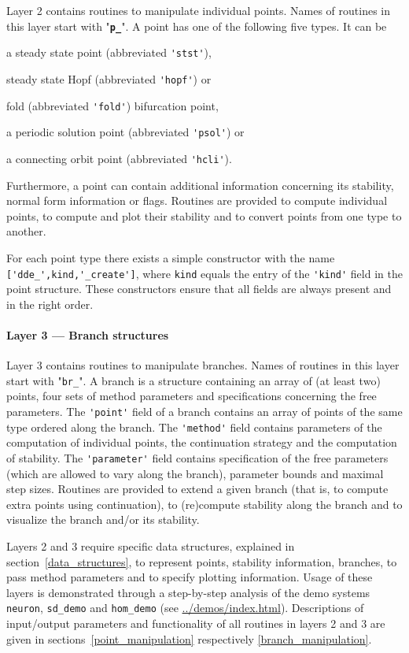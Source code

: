 \documentclass[10pt]{scrartcl}
\newcommand{\file}[1]{\textbf{\texttt{#1}}}
\newcommand{\demobase}{\url{../demos/index.html}}
\newcommand{\blist}[1]{\mbox{\lstinline!#1!}}
\begin{document}
Layer 2 contains routines to manipulate individual points.  Names of
routines in this layer start with "\file{p\_}".  A point has one of
the following five types. It can be
\begin{compactenum}
\item  a steady state point (abbreviated
\blist{'stst'}), 
\item steady state Hopf (abbreviated \blist{'hopf'}) or
\item fold (abbreviated \blist{'fold'}) bifurcation point, 
\item a periodic
  solution point (abbreviated \blist{'psol'}) or 
\item a connecting orbit
  point (abbreviated \blist{'hcli'}).
\end{compactenum}
Furthermore, a point can contain
additional information concerning its stability, normal form
information or flags.  Routines are provided to compute individual
points, to compute and plot their stability and to convert points from
one type to another.

For each point type there exists a simple constructor with the name
\blist{['dde_',kind,'_create']}, where \blist{kind} equals the entry
of the \blist{'kind'} field in the point structure. These constructors
ensure that all fields are always present and in the right order.

\paragraph{Layer 3 --- Branch structures}
Layer 3 contains routines to manipulate branches.  Names of routines
in this layer start with "\blist{br_}". A branch is a structure
containing an array of (at least two) points, four sets of method
parameters and specifications concerning the free parameters.  The
\blist{'point'} field of a branch contains an array of points of the
same type ordered along the branch.  The \blist{'method'} field
contains parameters of the computation of individual points, the
continuation strategy and the computation of stability.  The
\blist{'parameter'} field contains specification of the free
parameters (which are allowed to vary along the branch), parameter
bounds and maximal step sizes.  Routines are provided to extend a
given branch (that is, to compute extra points using continuation), to
(re)compute stability along the branch and to visualize the branch
and/or its stability.

Layers 2 and 3 require specific data structures, explained in
section~\ref{data_structures}, to represent points, stability
information, branches, to pass method parameters and to specify
plotting information.  Usage of these layers is
demonstrated %
through a step-by-step analysis of the demo systems \texttt{neuron},
\texttt{sd\_demo} and \texttt{hom\_demo} (see
\demobase{}).  Descriptions of input/output parameters and
functionality of all routines in layers 2 and 3 are given in
sections~\ref{point_manipulation} respectively
\ref{branch_manipulation}.
\end{document}
